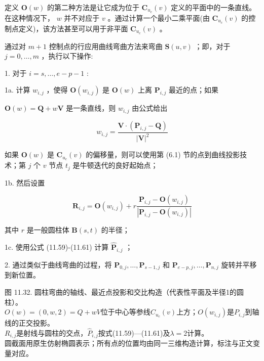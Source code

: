 \documentclass[../main.tex]{subfiles}
\begin{document}
定义 \(\mathbf{O}\left( w\right)\) 的第二种方法是让它成为位于 \({\mathbf{C}}_{{u}_{c}}\left( v\right)\) 定义的平面中的一条直线。在这种情况下， \(w\) 并不对应于 \(v\) 。通过计算一个最小二乘平面(由 \({\mathbf{C}}_{{u}_{c}}\left( v\right)\) 的控制点定义)，该方法甚至可以用于非平面 \({\mathbf{C}}_{{u}_{c}}\left( v\right)\) 。

通过对 \(m + 1\) 控制点的行应用曲线弯曲方法来弯曲 \(\mathbf{S}\left( {u,v}\right)\) ；即，对于 \(j = 0,\ldots ,m\) ，执行以下操作:

1. 对于 \(i = s,\ldots ,e - p - 1\) :

1a. 计算 \({w}_{i,j}\) ，使得 \(\mathbf{O}\left( {w}_{i,j}\right)\) 是 \(\mathbf{O}\left( w\right)\) 上离 \({\mathbf{P}}_{i,j}\) 最近的点；如果

\(\mathbf{O}\left( w\right)  = \mathbf{Q} + w\mathbf{V}\) 是一条直线，则 \({w}_{i,j}\) 由公式给出

\[
{w}_{i,j} = \frac{\mathbf{V} \cdot  \left( {{\mathbf{P}}_{i,j} - \mathbf{Q}}\right) }{{\left| \mathbf{V}\right| }^{2}} \tag{11.63}
\]

如果 \(\mathbf{O}\left( w\right)\) 是 \({\mathbf{C}}_{{u}_{c}}\left( v\right)\) 的偏移量，则可以使用第 (6.1) 节的点到曲线投影技术；第 \(j\) 个 \(v\) 节点 \({t}_{j}\) 是牛顿迭代的良好起始点；

1b. 然后设置

\[
{\mathbf{R}}_{i,j} = \mathbf{O}\left( {w}_{i,j}\right)  + r\frac{{\mathbf{P}}_{i,j} - \mathbf{O}\left( {w}_{i,j}\right) }{\left| {\mathbf{P}}_{i,j} - \mathbf{O}\left( {w}_{i,j}\right) \right| } \tag{11.64}
\]

其中 \(r\) 是一般圆柱体 \(\mathbf{B}\left( {s,t}\right)\) 的半径；

1c. 使用公式 (11.59)-(11.61) 计算 \({\widehat{\mathbf{P}}}_{i,j}\) ；

2. 通过类似于曲线弯曲的过程，将 \({\mathbf{P}}_{0,j},\ldots ,{\mathbf{P}}_{s - 1,j}\) 和 \({\mathbf{P}}_{e - p,j},\ldots ,{\mathbf{P}}_{n,j}\) 旋转并平移到新位置。

\begin{center}
\begin{minipage}{26cm}
\centering
{}
\par\smallskip
图 11.32. 圆柱弯曲的轴线、最近点投影和交比构造（代表性平面及半径1的圆柱）。\\
$O(w)=(0,w,2)=Q+wV$位于中心等参线$C_{u_c}(v)$上方；$O(w_{i,j})$是$P_{i,j}$到轴线的正交投影。\\
$R_{i,j}$是射线与圆柱的交点，$\widehat P_{i,j}$按式(11.59)—(11.61)及$\lambda=2$计算。\\
圆截面用原生仿射椭圆表示；所有点的位置均由同一三维构造计算，标注与正文变量对应。
\end{minipage}
\end{center}
\end{document}
